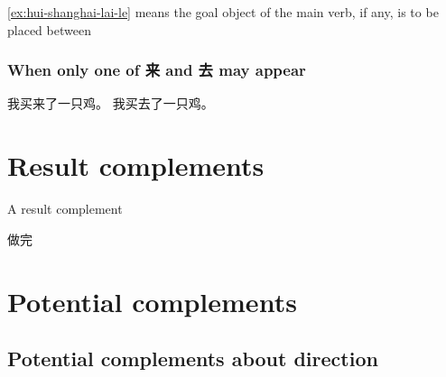\documentclass[../main.tex]{subfiles}
\begin{document}
\eqref{ex:hui-shanghai-lai-le} means the goal object of the main verb, if any,
is to be placed between 

\subsubsection{When only one of 来 and 去 may appear}


\begin{exe}
    \ex \begin{xlist}
        \ex 我买来了一只鸡。
        \ex *我买去了一只鸡。
    \end{xlist}
\end{exe}

\section{Result complements}\label{sec:result-complement}

A result complement 

做完

\section{Potential complements}\label{sec:potential-complement}

\subsection{Potential complements about direction}\label{sec:direction-potential-complement}
\end{document}
